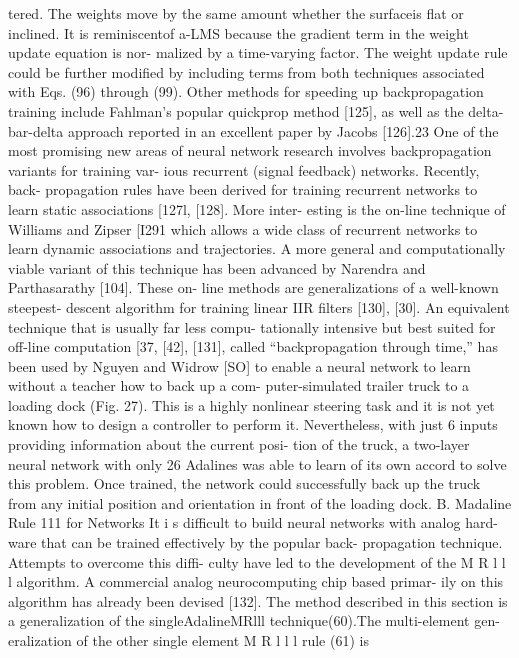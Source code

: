 tered. The weights move by the same amount whether the surfaceis flat or
inclined. It is reminiscentof a-LMS because the gradient term in the
weight update equation is nor- malized by a time-varying factor. The
weight update rule could be further modified by including terms from
both techniques associated with Eqs. (96) through (99). Other methods
for speeding up backpropagation training include Fahlman's popular
quickprop method {[}125{]}, as well as the delta-bar-delta approach
reported in an excellent paper by Jacobs {[}126{]}.23 One of the most
promising new areas of neural network research involves backpropagation
variants for training var- ious recurrent (signal feedback) networks.
Recently, back- propagation rules have been derived for training
recurrent networks to learn static associations {[}127l, {[}128{]}. More
inter- esting is the on-line technique of Williams and Zipser {[}I291
which allows a wide class of recurrent networks to learn dynamic
associations and trajectories. A more general and computationally viable
variant of this technique has been advanced by Narendra and
Parthasarathy {[}104{]}. These on- line methods are generalizations of a
well-known steepest- descent algorithm for training linear IIR filters
{[}130{]}, {[}30{]}. An equivalent technique that is usually far less
compu- tationally intensive but best suited for off-line computation
{[}37, {[}42{]}, {[}131{]}, called ``backpropagation through time,'' has
been used by Nguyen and Widrow {[}SO{]} to enable a neural network to
learn without a teacher how to back up a com- puter-simulated trailer
truck to a loading dock (Fig. 27). This is a highly nonlinear steering
task and it is not yet known how to design a controller to perform it.
Nevertheless, with just 6 inputs providing information about the current
posi- tion of the truck, a two-layer neural network with only 26
Adalines was able to learn of its own accord to solve this problem. Once
trained, the network could successfully back up the truck from any
initial position and orientation in front of the loading dock. B.
Madaline Rule 111 for Networks It i s difficult to build neural networks
with analog hard- ware that can be trained effectively by the popular
back- propagation technique. Attempts to overcome this diffi- culty have
led to the development of the M R l l l algorithm. A commercial analog
neurocomputing chip based primar- ily on this algorithm has already been
devised {[}132{]}. The method described in this section is a
generalization of the singleAdalineMRlll technique(60).The multi-element
gen- eralization of the other single element M R l l l rule (61) is
